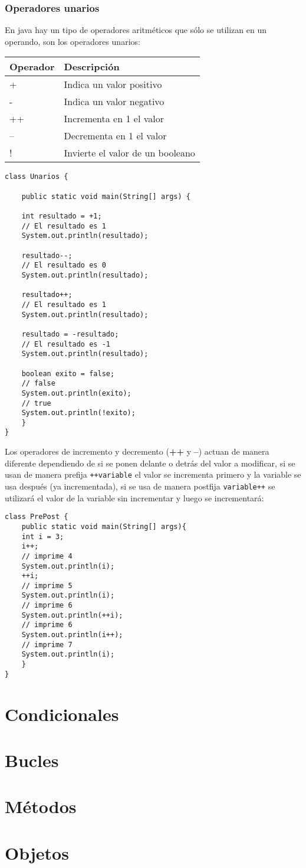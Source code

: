 \documentclass[11pt]{article}
\begin{document}
\subsubsection{Operadores unarios}
\label{sec:orgf5b7adc}
En java hay un tipo de operadores aritméticos que sólo se utilizan en un operando, son los operadores unarios:
\begin{center}
\begin{tabular}{ll}
Operador & Descripción\\
\hline
+ & Indica un valor positivo\\
- & Indica un valor negativo\\
++ & Incrementa en 1 el valor\\
-- & Decrementa en 1 el valor\\
! & Invierte el valor de un booleano\\
\end{tabular}
\end{center}

\begin{verbatim}
class Unarios {

    public static void main(String[] args) {

	int resultado = +1;
	// El resultado es 1
	System.out.println(resultado);

	resultado--;
	// El resultado es 0
	System.out.println(resultado);

	resultado++;
	// El resultado es 1
	System.out.println(resultado);

	resultado = -resultado;
	// El resultado es -1
	System.out.println(resultado);

	boolean exito = false;
	// false
	System.out.println(exito);
	// true
	System.out.println(!exito);
    }
}
\end{verbatim}

Los operadores de incremento y decremento (\textbf{++} y \textbf{--}) actuan de manera diferente dependiendo de si se ponen delante o detrás del valor a modificar, si se usan de manera prefija \texttt{++variable} el valor se incrementa primero y la variable se usa después (ya incrementada), si se usa de manera postfija \texttt{variable++} se utilizará el valor de la variable sin incrementar y luego se incrementará:

\begin{verbatim}
class PrePost {
    public static void main(String[] args){
	int i = 3;
	i++;
	// imprime 4
	System.out.println(i);
	++i;			   
	// imprime 5
	System.out.println(i);
	// imprime 6
	System.out.println(++i);
	// imprime 6
	System.out.println(i++);
	// imprime 7
	System.out.println(i);
    }
}
\end{verbatim}
\section{Condicionales}
\label{sec:orgf5f104e}
\section{Bucles}
\label{sec:org6f58d08}
\section{Métodos}
\label{sec:org6c843bf}
\section{Objetos}
\label{sec:org9c8b5a6}
\end{document}
